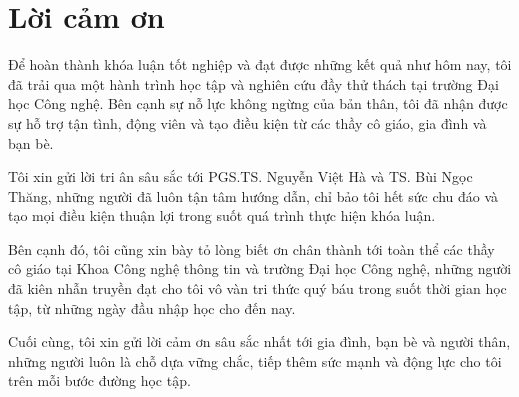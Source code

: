 \chapter*{Lời cảm ơn}


Để hoàn thành khóa luận tốt nghiệp và đạt được những kết quả như hôm nay, tôi đã trải qua một hành trình học tập và nghiên cứu đầy thử thách tại trường Đại học Công nghệ. Bên cạnh sự nỗ lực không ngừng của bản thân, tôi đã nhận được sự hỗ trợ tận tình, động viên và tạo điều kiện từ các thầy cô giáo, gia đình và bạn bè.

Tôi xin gửi lời tri ân sâu sắc tới PGS.TS. Nguyễn Việt Hà và TS. Bùi Ngọc Thăng, những người đã luôn tận tâm hướng dẫn, chỉ bảo tôi hết sức chu đáo và tạo mọi điều kiện thuận lợi trong suốt quá trình thực hiện khóa luận.

Bên cạnh đó, tôi cũng xin bày tỏ lòng biết ơn chân thành tới toàn thể các thầy cô giáo tại Khoa Công nghệ thông tin và trường Đại học Công nghệ, những người đã kiên nhẫn truyền đạt cho tôi vô vàn tri thức quý báu trong suốt thời gian học tập, từ những ngày đầu nhập học cho đến nay.

Cuối cùng, tôi xin gửi lời cảm ơn sâu sắc nhất tới gia đình, bạn bè và người thân, những người luôn là chỗ dựa vững chắc, tiếp thêm sức mạnh và động lực cho tôi trên mỗi bước đường học tập.